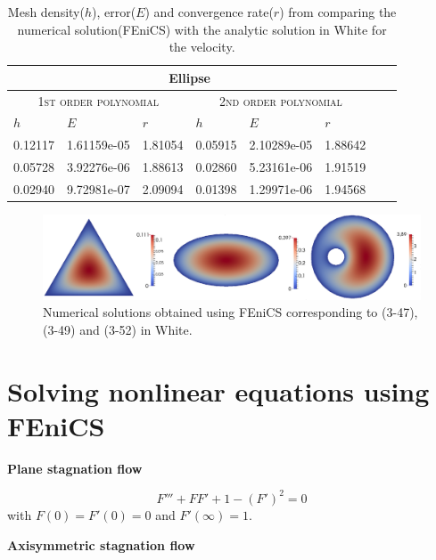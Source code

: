 \documentclass[11pt,a4paper,english]{article}
\numberwithin{equation}{section}
\begin{document}
\begin{table}[H]
\centering
\caption{Mesh density($h$), error($E$) and convergence rate($r$) from comparing the numerical solution(FEniCS) with the analytic solution in White for the velocity. }
\vspace{3mm}
\begin{tabular}{|l|l|l|l|l|l|l|l|}
\hline
 \multicolumn{6}{|c|}{\textbf{Ellipse}}   \\
\hline
 \multicolumn{3}{|c|}{ \textsc{1st order polynomial}} &  \multicolumn{3}{|c|}{\textsc{2nd order polynomial}}  \\
\hline
$h$ & $E$ & $r$ & $h$ & $E$ & $r$   \\
\hline
0.12117 & 1.61159e-05 & 1.81054 & 0.05915 & 2.10289e-05 & 1.88642 \\
0.05728 & 3.92276e-06 & 1.88613 & 0.02860 & 5.23161e-06 & 1.91519 \\
0.02940 & 9.72981e-07 & 2.09094 & 0.01398 & 1.29971e-06 & 1.94568 \\
\hline
\end{tabular}
\label{tab:time}
\end{table}


\vspace{1.5cm}
\begin{figure}[h!] 
\begin{center}
  \includegraphics[scale=0.18]{ducts.png}
  \end{center}
  \caption{Numerical solutions obtained using FEniCS corresponding to (3-47), (3-49) and (3-52) in White.}
\end{figure}

\section{Solving nonlinear equations using FEniCS}

\textbf{Plane stagnation flow}

\begin{equation}
F''' + FF' + 1 - (F')^2 = 0
\end{equation}
with $F(0) = F'(0) = 0$ and $F'(\infty)=1$.

\textbf{Axisymmetric stagnation flow}
\end{document}
